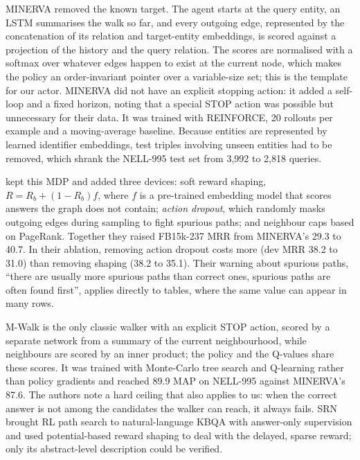 MINERVA \citep{das2018minerva} removed the known target. The agent starts at the query entity, an LSTM summarises the walk so far, and every outgoing edge, represented by the concatenation of its relation and target-entity embeddings, is scored against a projection of the history and the query relation. The scores are normalised with a softmax over whatever edges happen to exist at the current node, which makes the policy an order-invariant pointer over a variable-size set; this is the template for our actor. MINERVA did not have an explicit stopping action: it added a self-loop and a fixed horizon, noting that a special STOP action was possible but unnecessary for their data. It was trained with REINFORCE, 20 rollouts per example and a moving-average baseline. Because entities are represented by learned identifier embeddings, test triples involving unseen entities had to be removed, which shrank the NELL-995 test set from 3{,}992 to 2{,}818 queries.

\citet{lin2018multihop} kept this MDP and added three devices: soft reward shaping, $R=R_b+(1-R_b)f$, where $f$ is a pre-trained embedding model that scores answers the graph does not contain; \emph{action dropout}, which randomly masks outgoing edges during sampling to fight spurious paths; and neighbour caps based on PageRank. Together they raised FB15k-237 MRR from MINERVA's 29.3 to 40.7. In their ablation, removing action dropout costs more (dev MRR 38.2 to 31.0) than removing shaping (38.2 to 35.1). Their warning about spurious paths, ``there are usually more spurious paths than correct ones, spurious paths are often found first'', applies directly to tables, where the same value can appear in many rows.

M-Walk \citep{shen2018mwalk} is the only classic walker with an explicit STOP action, scored by a separate network from a summary of the current neighbourhood, while neighbours are scored by an inner product; the policy and the Q-values share these scores. It was trained with Monte-Carlo tree search and Q-learning rather than policy gradients and reached 89.9 MAP on NELL-995 against MINERVA's 87.6. The authors note a hard ceiling that also applies to us: when the correct answer is not among the candidates the walker can reach, it always fails. SRN \citep{qiu2020srn} brought RL path search to natural-language KBQA with answer-only supervision and used potential-based reward shaping to deal with the delayed, sparse reward; only its abstract-level description could be verified.

